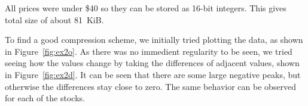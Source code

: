 \documentclass{article}
\begin{document}
All prices were under \$40 so they can be stored as 16-bit integers.
This gives total size of about 81~KiB.


To find a good compression scheme, we initially tried plotting the data, as shown in Figure~\ref{fig:ex2o}.
As there was no immedient regularity to be seen, we tried seeing how the values change by taking the differences of adjacent values, shown in Figure~\ref{fig:ex2d}.
It can be seen that there are some large negative peaks, but otherwise the differences stay close to zero.
The same behavior can be observed for each of the stocks.

\begin{figure}

\end{figure}
\end{document}
